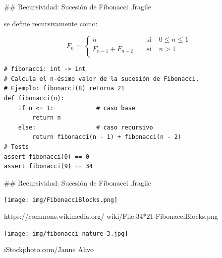 ## Recursividad: Sucesión de Fibonacci {.fragile}

\bgnblocknormal
{} se define recursivamente como:
\trmblocknormal

\vspace{-2ex}

$$ F_n = \begin{cases}
        n                 & \;\;\;\;\text{si} \;\;\;\; 0 \leq n \leq 1 \\
        F_{n-1} + F_{n-2} & \;\;\;\;\text{si} \;\;\;\; n > 1 \\
    \end{cases}
$$

\vspace{1ex}
\begin{lstlisting}[style=frame02]
# fibonacci: int -> int
# Calcula el n-ésimo valor de la sucesión de Fibonacci.
# Ejemplo: fibonacci(8) retorna 21
def fibonacci(n):
    if n <= 1:            # caso base
        return n
    else:                 # caso recursivo
        return fibonacci(n - 1) + fibonacci(n - 2)
# Tests
assert fibonacci(0) == 0
assert fibonacci(9) == 34
\end{lstlisting}

## Recursividad: Sucesión de Fibonacci {.fragile}


\bgncolumns
{}

\texttt{[image: img/FibonacciBlocks.png]}

\scriptsize{https://commons.wikimedia.org/
wiki/File:34*21-FibonacciBlocks.png}

\texttt{[image: img/fibonacci-nature-3.jpg]}

\scriptsize{iStockphoto.com/Janne Ahvo}

\trmcolumns
